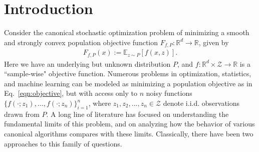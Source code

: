 \documentclass[11pt,twoside]{article}
\numberwithin{equation}{section}
\newcommand{\EE}{\mathbb{E}}
\newcommand{\RR}{\mathbb{R}}
\newcommand{\1}{\mathbf{1}}
\theoremstyle{remark}
\theoremstyle{plain}
\newcommand{\cZ}{\mathcal{Z}}
\begin{document}
\section{Introduction} \label{sec:intro}
Consider the canonical stochastic optimization problem of minimizing a smooth and strongly convex population objective function $F_{f,P}: \RR^d \to \RR$, given by
	\begin{align}\label{eqn:objective}
	F_{f,P}(x) := \EE_{z \sim P}[f(x,z)].
	\end{align}
	Here we have an underlying but unknown distribution $P$, and $f\colon \RR^d \times \cZ \rightarrow \RR$ is a ``sample-wise" objective function.
	Numerous problems in optimization, statistics, and machine learning can be modeled as minimizing a population objective as in Eq.~\eqref{eqn:objective}, but with access only to $n$ noisy functions $\{f(\cdot; z_1), \ldots, f(\cdot; z_n)\}_{i = 1}^n$, where $z_1, z_2,\ldots, z_n \in \cZ$ denote i.i.d. observations drawn from $P$. A long line of literature has focused on understanding the fundamental limits of this problem, and on analyzing how the behavior of various canonical algorithms compares with these limits. 
    Classically, there have been two approaches to this family of questions.
    
\end{document}
